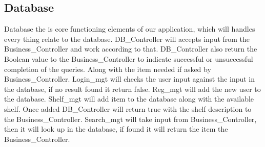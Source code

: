 \subsection{Database}
Database the is core functioning elements of our application, which will handles every thing relate to the database. DB\_Controller will accepts input from the Business\_Controller and work according to that. DB\_Controller also return the Boolean value to the Business\_Controller to indicate successful or unsuccessful completion of the queries. Along with the item needed if asked by Business\_Controller. Login\_mgt will checks the user input against the input in the database, if no result found it return false. Reg\_mgt will add the new user to the database. Shelf\_mgt will add item to the database along with the available shelf. Once added DB\_Controller will return true with the shelf description to the Business\_Controller. Search\_mgt will take input from Business\_Controller, then it will look up in the database, if found it will return the item  the Business\_Controller.   